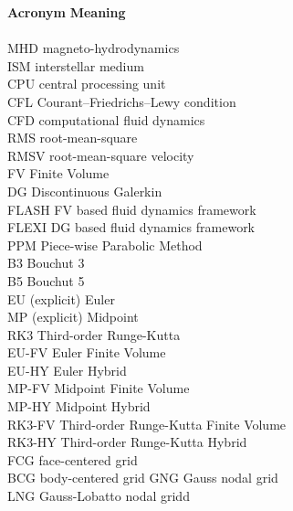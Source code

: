 \begin{tabbing}
\textbf{Acronym}    \hspace{2cm}\=\textbf{Meaning} \\\\

MHD             \> magneto-hydrodynamics \\
ISM             \> interstellar medium \\
CPU             \> central processing unit \\
CFL             \> Courant–Friedrichs–Lewy condition \\
CFD             \> computational fluid dynamics \\
RMS             \> root-mean-square \\
RMSV            \> root-mean-square velocity \\
FV              \> Finite Volume \\
DG              \> Discontinuous Galerkin \\
FLASH           \> FV based fluid dynamics framework \\
FLEXI           \> DG based fluid dynamics framework \\
PPM             \> Piece-wise Parabolic Method \\
B3              \> Bouchut 3 \\
B5              \> Bouchut 5 \\
EU              \> (explicit) Euler \\
MP              \> (explicit) Midpoint \\
RK3             \> Third-order Runge-Kutta \\
EU-FV           \> Euler Finite Volume \\
EU-HY           \> Euler Hybrid \\
MP-FV           \> Midpoint Finite Volume \\
MP-HY           \> Midpoint Hybrid \\
RK3-FV          \> Third-order Runge-Kutta Finite Volume \\
RK3-HY          \> Third-order Runge-Kutta Hybrid \\
FCG             \> face-centered grid \\
BCG             \> body-centered grid
GNG             \> Gauss nodal grid \\
LNG             \> Gauss-Lobatto nodal gridd \\

\end{tabbing}
\newpage
